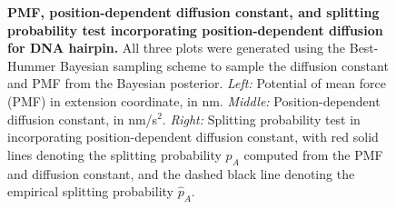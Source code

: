 \documentclass[aps,prl,twocolumn,superscriptaddress,floatfix]{revtex4-1}
\begin{document}
\begin{figure}[tbp]
\caption{{\bf PMF, position-dependent diffusion constant, and splitting probability test incorporating position-dependent diffusion for DNA hairpin.}
All three plots were generated using the Best-Hummer Bayesian sampling scheme to sample the diffusion constant and PMF from the Bayesian posterior.
\emph{Left:} Potential of mean force (PMF) in extension coordinate, in nm.
\emph{Middle:} Position-dependent diffusion constant, in nm/s$^2$.
\emph{Right:} Splitting probability test in incorporating position-dependent diffusion constant, with red solid lines denoting the splitting probability $p_A$ computed from the PMF and diffusion constant, and the dashed black line denoting the empirical splitting probability $\hat{p}_A$.
}
\label{figure:coordinate-dependent-diffusion-hairpin}
\end{figure}


\end{document}
